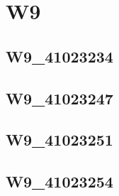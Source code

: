 \chapter{W9}
\section{W9_41023234}
\section{W9_41023247}
\section{W9_41023251}
\section{W9_41023254}